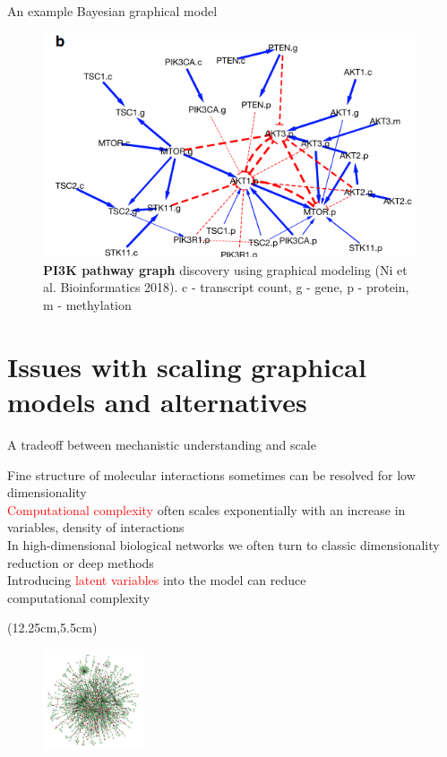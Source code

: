 \documentclass[aspectratio=1610]{beamer}					%
\begin{document}
\begin{frame}{An example Bayesian graphical model}

\begin{figure}
\includegraphics[width=11cm]{pi3k-pathway.png}
\caption{\textbf{PI3K pathway graph} discovery using graphical modeling (Ni et al. Bioinformatics 2018). c - transcript count, g - gene, p - protein, m - methylation}
\end{figure}
\end{frame}

\section{Issues with scaling graphical models and alternatives}
\begin{frame}{A tradeoff between mechanistic understanding and scale}

Fine structure of molecular interactions sometimes can be resolved for low dimensionality\\
\vspace{0.2in}
\textcolor{red}{Computational complexity} often scales exponentially with an increase in variables, density of interactions\\
\vspace{0.2in}
In high-dimensional biological networks we often turn to classic dimensionality reduction or deep methods\\
\vspace{0.2in}
Introducing \textcolor{red}{latent variables} into the model can reduce \\computational complexity


\begin{textblock*}{3cm}(12.25cm,5.5cm)
\begin{figure}
\includegraphics[width=3cm]{net.png}
\end{figure}
\end{textblock*}

\end{frame}
\end{document}
